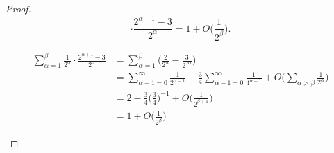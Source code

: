 \documentclass[12pt, reqno, twoside, letterpaper]{amsart}
\begin{document}
\begin{jetsam}
\begin{proof}
\begin{equation}
    \cdot 
     \frac{2^{\alpha + 1} - 3}{2^{\alpha}}
    =
      1 + O\bigg(\frac{1}{2^{\beta}}\bigg).
\end{equation}
%
\begin{nixnix}
\begin{align*}
 \sum_{\alpha = 1}^{\beta}
  \frac{1}{2^{\alpha}}
   \cdot \frac{2^{\alpha + 1} - 3}{2^{\alpha}}
 & =
    \sum_{\alpha = 1}^{\beta}
     \bigg(\frac{2}{2^{\alpha}} - \frac{3}{2^{2\alpha}}\bigg)
 \\
 & = 
    \sum_{\alpha - 1 = 0}^{\infty} \frac{1}{2^{\alpha - 1}}
     -
     \frac{3}{4}
      \sum_{\alpha - 1 = 0}^{\infty} \frac{1}{4^{\alpha - 1}}
       +
        O\bigg(\sum_{\alpha > \beta} \frac{1}{2^{\alpha}}\bigg)
 \\
 & = 
    2 - \frac{3}{4}\bigg(\frac{3}{4}\bigg)^{-1} + O\bigg(\frac{1}{2^{\beta + 1}}\bigg) 
 \\
 & = 
     1 + O\bigg(\frac{1}{2^{\beta}}\bigg)
\end{align*}
\end{nixnix}


\end{proof}
\end{jetsam}
\end{document}

